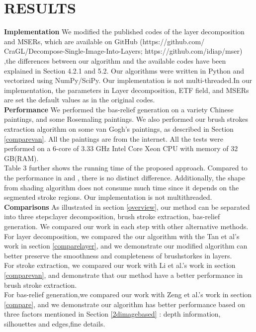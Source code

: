 \chapter{RESULTS}

\textbf{Implementation}  We modified the published codes of the layer decomposition and MSERs, which are available on GitHub (https://github.com/ CraGL/Decompose-Single-Image-Into-Layers; https://github.com/idiap/mser) ,the differences between our algorithm and the available codes have been explained in Section 4.2.1 and 5.2. Our algorithms were written in Python and vectorized using NumPy/SciPy. Our implementation is not multi-threaded.In our implementation, the parameters in Layer decomposition, ETF field, and MSERs are set the default values as in the original codes.\\ 
\textbf{Performance}  We performed the bas-relief generation on a variety Chinese paintings, and some Rosemaling paintings. We also performed our brush strokes extraction algorithm on some van Gogh's paintings, as described in Section \ref{comparevan}. All the paintings are from the internet.  All the tests were performed on a 6-core of 3.33 GHz Intel Core Xeon CPU with memory of 32 GB(RAM).\\
Table 3 further shows the running time of the proposed approach. Compared to the performance in \cite{tan2016decomposing} and \cite{nister2008linear}, there is no distinct difference. Additionally, the shape from shading algorithm does not consume much time since it depends on the segmented stroke regions. Our implementation is not multithreaded. \\
\textbf{Comparisons}  
As illustrated in section \ref{overview}, our method can be separated into three steps:layer decomposition, brush stroke extraction, bas-relief generation. We compared our work in each step with other alternative methods.\\
For layer decomposition, we compared the our algorithm with the Tan et al's work \cite{tan2016decomposing} in section \ref{comparelayer}, and we demonstrate our modified algorithm can better preserve the smoothness and completeness of brushstorkes in layers. \\
For stroke extraction, we compared our work with Li et al.'s work \cite{li2012rhythmic} in section \ref{comparevan}, and demonstrate that our method have a better performance in brush stroke extraction.\\
For bas-relief generation,we compared our work with Zeng et al.'s work \cite{zeng2014region} in section \ref{compare}, and we demonstrate our algorithm has better performance based on three factors mentioned in Section \ref{2dimagebased} : depth information, silhouettes and edges,fine details. \\
